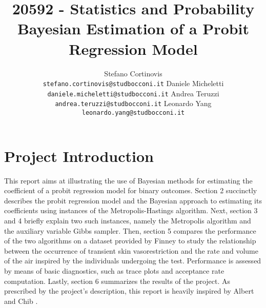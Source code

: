 \documentclass{article}
\title{20592 - Statistics and Probability\\Bayesian Estimation of a Probit Regression Model}
\author{%
  Stefano Cortinovis \\
  \texttt{stefano.cortinovis@studbocconi.it}
  \And
  Daniele Micheletti\\
  \texttt{daniele.micheletti@studbocconi.it}
  \And
  Andrea Teruzzi\\
  \texttt{andrea.teruzzi@studbocconi.it}
  \And
  Leonardo Yang\\
  \texttt{leonardo.yang@studbocconi.it}
}
\begin{document}
\maketitle

\section{Project Introduction}

This report aims at illustrating the use of Bayesian methods for estimating the coefficient of a probit regression model for binary outcomes. Section 2 succinctly describes the probit regression model and the Bayesian approach to estimating its coefficients using instances of the Metropolis-Hastings algorithm. Next, section 3 and 4 briefly explain two such instances, namely the Metropolis algorithm and the auxiliary variable Gibbs sampler. Then, section 5 compares the performance of the two algorithms on a dataset provided by Finney \cite{finney1947estimation} to study the relationship between the occurrence of transient skin vasorestriction and the rate and volume of the air inspired by the individuals undergoing the test. Performance is assessed by means of basic diagnostics, such as trace plots and acceptance rate computation. Lastly, section 6 summarizes the results of the project. As prescribed by the project's description, this report is heavily inspired by Albert and Chib \cite{albert1993bayesian}.
\end{document}
